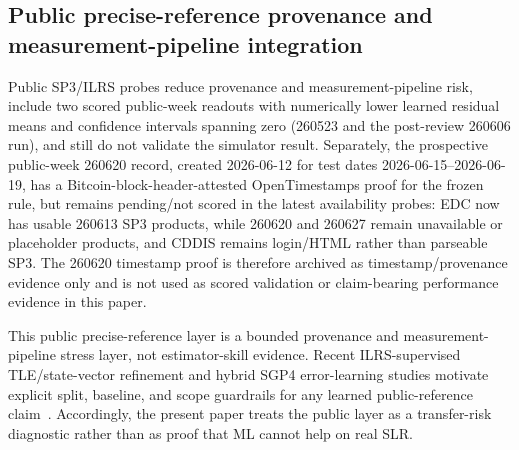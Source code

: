 \documentclass{article}
\begin{document}
\subsection{Public precise-reference provenance and measurement-pipeline integration}\label{sec:precise-ref-integration}
Public SP3/ILRS probes reduce provenance and measurement-pipeline risk, include two scored public-week readouts with numerically lower learned residual means and confidence intervals spanning zero (260523 and the post-review 260606 run), and still do not validate the simulator result.
Separately, the prospective public-week 260620 record, created 2026-06-12 for test dates 2026-06-15--2026-06-19, has a Bitcoin-block-header-attested OpenTimestamps proof for the frozen rule, but remains pending/not scored in the latest availability probes: EDC now has usable 260613 SP3 products, while 260620 and 260627 remain unavailable or placeholder products, and CDDIS remains login/HTML rather than parseable SP3. The 260620 timestamp proof is therefore archived as timestamp/provenance evidence only and is not used as scored validation or claim-bearing performance evidence in this paper.

This public precise-reference layer is a bounded provenance and measurement-pipeline stress layer, not estimator-skill evidence. Recent ILRS-supervised TLE/state-vector refinement and hybrid SGP4 error-learning studies motivate explicit split, baseline, and scope guardrails for any learned public-reference claim~\cite{belyakov2025satellites,segura2026hybridsgp4}. Accordingly, the present paper treats the public layer as a transfer-risk diagnostic rather than as proof that ML cannot help on real SLR.
\end{document}
